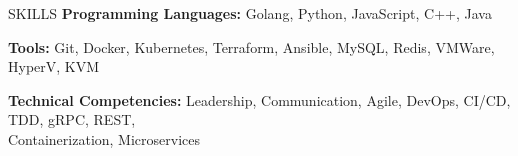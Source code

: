 \documentclass{resume} %
\begin{document}
\begin{rSection}{SKILLS}
\textbf{Programming Languages:}
Golang, Python, JavaScript, C++, Java

\textbf{Tools:}
Git, Docker, Kubernetes, Terraform, Ansible, MySQL, Redis, VMWare, HyperV, KVM

\textbf{Technical Competencies:}
Leadership, Communication, Agile, DevOps, CI/CD, TDD, gRPC, REST, \\
Containerization, Microservices

\end{rSection}
\end{document}
